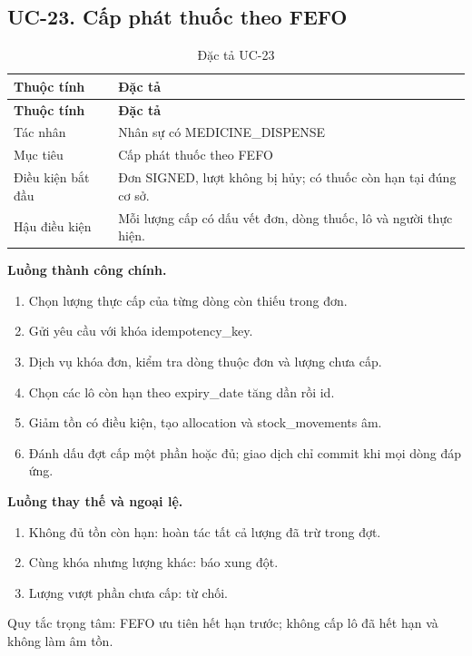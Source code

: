 \clearpage

\subsection{UC-23.\allowbreak{} Cấp phát thuốc theo FEFO}
\label{uc:23}

{\small\setlength{\tabcolsep}{3pt}\renewcommand{\arraystretch}{1.12}
\begin{longtable}{@{}L{\textwidth-1.32pt\relax} L{\textwidth-4.68pt\relax}@{}}
\caption{Đặc tả UC-23}\\
\toprule
\textbf{Thuộc tính} & \textbf{Đặc tả}\\\midrule
\endfirsthead
\toprule
\textbf{Thuộc tính} & \textbf{Đặc tả}\\\midrule
\endhead
\bottomrule\endlastfoot
Tác nhân & Nhân sự có MEDICINE\_\allowbreak{}DISPENSE\\[3pt]
Mục tiêu & Cấp phát thuốc theo FEFO\\[3pt]
Điều kiện bắt đầu & Đơn SIGNED, lượt không bị hủy; có thuốc còn hạn tại đúng cơ sở.\allowbreak{}\\[3pt]
Hậu điều kiện & Mỗi lượng cấp có dấu vết đơn, dòng thuốc, lô và người thực hiện.\allowbreak{}\\[3pt]
\end{longtable}}
\noindent\textbf{Luồng thành công chính.}
\begin{enumerate}
\item Chọn lượng thực cấp của từng dòng còn thiếu trong đơn.\allowbreak{}
\item Gửi yêu cầu với khóa idempotency\_\allowbreak{}key.\allowbreak{}
\item Dịch vụ khóa đơn, kiểm tra dòng thuộc đơn và lượng chưa cấp.\allowbreak{}
\item Chọn các lô còn hạn theo expiry\_\allowbreak{}date tăng dần rồi id.\allowbreak{}
\item Giảm tồn có điều kiện, tạo allocation và stock\_\allowbreak{}movements âm.\allowbreak{}
\item Đánh dấu đợt cấp một phần hoặc đủ; giao dịch chỉ commit khi mọi dòng đáp ứng.\allowbreak{}
\end{enumerate}
\noindent\textbf{Luồng thay thế và ngoại lệ.}
\begin{enumerate}
\item Không đủ tồn còn hạn:\allowbreak{} hoàn tác tất cả lượng đã trừ trong đợt.\allowbreak{}
\item Cùng khóa nhưng lượng khác:\allowbreak{} báo xung đột.\allowbreak{}
\item Lượng vượt phần chưa cấp:\allowbreak{} từ chối.\allowbreak{}
\end{enumerate}
Quy tắc trọng tâm:\allowbreak{} FEFO ưu tiên hết hạn trước; không cấp lô đã hết hạn và không làm âm tồn.\allowbreak{}

